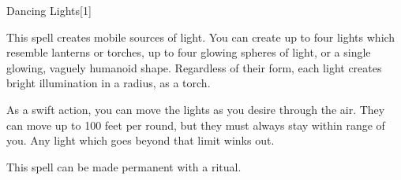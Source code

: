 
\begin{spellsection}{Dancing Lights}[1]
    \begin{spellheader}
    \end{spellheader}
    \begin{spellcontent}
        \begin{spelltargetinginfo}
            \spellrng{\rngmed}
        \end{spelltargetinginfo}
        \begin{spelleffects}
            \spelleffect This spell creates mobile sources of light. You can create up to four lights which resemble lanterns or torches, up to four glowing spheres of light, or a single glowing, vaguely humanoid shape. Regardless of their form, each light creates bright illumination in a \areamed radius, as a torch.

            As a swift action, you can move the lights as you desire through the air. They can move up to 100 feet per round, but they must always stay within range of you. Any light which goes beyond that limit winks out.
            \spelldur \durshort \dismissable
        \end{spelleffects}
    \end{spellcontent}
    \begin{spellfooter}
        \spellnotes This spell can be made permanent with a  ritual.
        \miscastexplode
    \end{spellfooter}
\end{spellsection}

